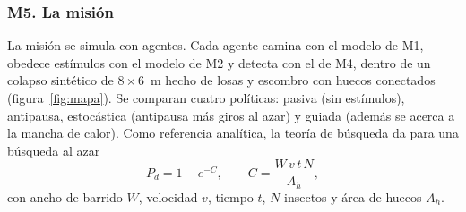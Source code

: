 \subsubsection{M5. La misión}

La misión se simula con agentes. Cada agente camina con el modelo de M1, obedece estímulos
con el modelo de M2 y detecta con el de M4, dentro de un colapso sintético de $8\times6$~m
hecho de losas y escombro con huecos conectados (figura~\ref{fig:mapa}). Se comparan cuatro
políticas: pasiva (sin estímulos), antipausa, estocástica (antipausa más giros al azar) y guiada
(además se acerca a la mancha de calor). Como referencia analítica, la teoría de búsqueda da
para una búsqueda al azar~\cite{frost2001}
\begin{equation}
P_d=1-e^{-C},\qquad C=\frac{W\,v\,t\,N}{A_h},
\end{equation}
con ancho de barrido $W$, velocidad $v$, tiempo $t$, $N$ insectos y área de huecos $A_h$.

